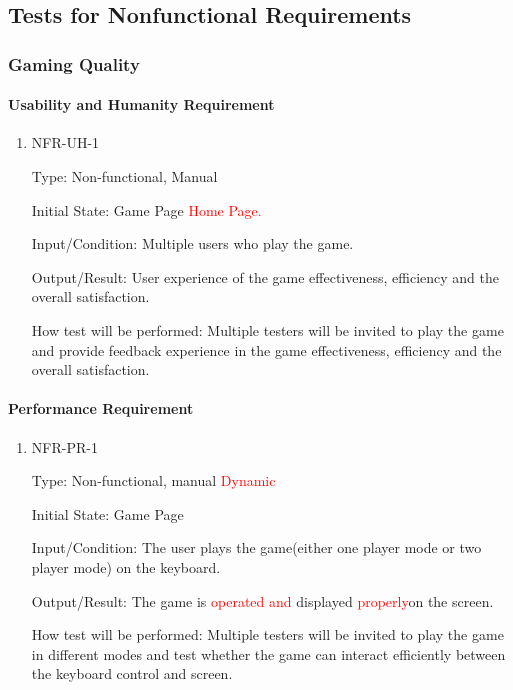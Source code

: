 \documentclass[12pt, titlepage]{article}
\begin{document}
\subsection{Tests for Nonfunctional Requirements}

\subsubsection{Gaming Quality}

\paragraph{Usability and Humanity Requirement}

\begin{enumerate}

\item{NFR-UH-1\\}

Type: Non-functional, Manual
					
Initial State: Game Page \textcolor{red}{Home Page.}
					
Input/Condition: Multiple users who play the game. 

Output/Result: User experience of the game effectiveness, efficiency and the overall satisfaction. 
	
How test will be performed: Multiple testers will be invited to play the game and provide feedback experience in the game effectiveness, efficiency and the overall satisfaction. 

\end{enumerate}

\paragraph{Performance Requirement}

\begin{enumerate}

\item{NFR-PR-1\\}

Type: Non-functional, manual \textcolor{red}{Dynamic}
					
Initial State: Game Page
					
Input/Condition: The user plays the game(either one player mode or two player mode) on the keyboard.

Output/Result: The game is \textcolor{red}{operated and }displayed \textcolor{red}{properly}on the screen. 
	
How test will be performed: Multiple testers will be invited to play the game in different modes and test whether the game can interact efficiently between the keyboard control and screen.  

\end{enumerate}
\end{document}
